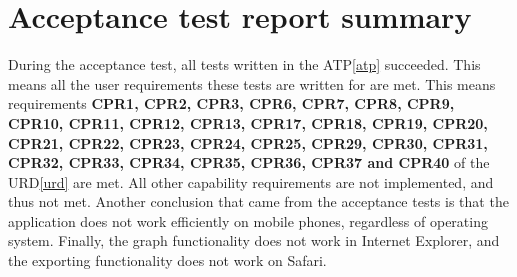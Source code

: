 \chapter{Acceptance test report summary}
\label{chap:testreports}

During the acceptance test, all tests written in the ATP\ref{atp} succeeded. This means all the user requirements these tests are written for are met. This means requirements \textbf{CPR1, CPR2, CPR3, CPR6, CPR7, CPR8, CPR9, CPR10, CPR11, CPR12, CPR13, CPR17, CPR18, CPR19, CPR20, CPR21, CPR22, CPR23, CPR24, CPR25, CPR29, CPR30, CPR31, CPR32, CPR33, CPR34, CPR35, CPR36, CPR37 and CPR40} of the URD\ref{urd} are met. All other capability requirements are not implemented, and thus not met. Another conclusion that came from the acceptance tests is that the application does not work efficiently on mobile phones, regardless of operating system. Finally, the graph functionality does not work in Internet Explorer, and the exporting functionality does not work on Safari.
